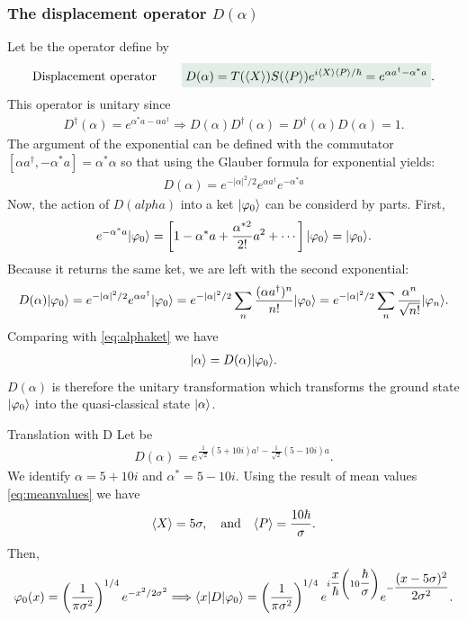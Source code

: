 \subsubsection{The displacement operator $D(\alpha)$}
Let be the operator define by 
\begin{align}
    \text{Displacement operator}\qquad\highlight{D(\alpha)=T(\braket{X})S(\braket{P})e^{i\braket{X}\braket{P}/\hbar}=e^{\alpha a^\dagger-\alpha^*a}}.
\end{align}
This operator is unitary since 
\begin{align*}
    D^\dagger(\alpha)=e^{\alpha^*a-\alpha a^\dagger}\Longrightarrow D(\alpha)D^\dagger(\alpha)=D^\dagger(\alpha)D(\alpha)=1.
\end{align*}
The argument of the exponential can be defined with the commutator $[\alpha a^\dagger,-\alpha^* a]=\alpha^*\alpha$ so that using the Glauber formula for exponential 
yields:
\begin{align*}
    D(\alpha)=e^{-|\alpha|^2/2}e^{\alpha a^\dagger}e^{-\alpha^*a}
\end{align*}
Now, the action of $D(alpha)$ into a ket $|\varphi_0\rangle$ can be considerd by parts. First,
\begin{align*}
    e^{-\alpha^*a}|\varphi_0\rangle=\left[1-\alpha^*a+\frac{\alpha^{*2}}{2!}a^2+\cdots\right]|\varphi_0\rangle=|\varphi_0\rangle.
\end{align*}
Because it returns the same ket, we are left with the second exponential:
\begin{align*}
    D(\alpha)|\varphi_0\rangle=e^{-|\alpha|^2/2}e^{\alpha a^\dagger}|\varphi_0\rangle=e^{-|\alpha|^2/2}\sum_n\frac{(\alpha a^\dagger)^n}{n!}|\varphi_0\rangle=e^{-|\alpha|^2/2}\sum_n\frac{\alpha^n}{\sqrt{n!}}|\varphi_n\rangle.
\end{align*}
Comparing with \eqref{eq:alphaket} we have 
\begin{align}
    |\alpha\rangle=D(\alpha)|\varphi_0\rangle.
\end{align}
$D(\alpha)$ is therefore the unitary transformation which transforms the ground state $|\varphi_0\rangle$ into the quasi-classical state $|\alpha\rangle$.
\begin{example}{Translation with D}
    Let be 
    \begin{align*}
        D(\alpha)=e^{\frac{1}{\sqrt{2}}(5+10i)a^\dagger-\frac{1}{\sqrt{2}}(5-10i)a}.
    \end{align*}
    We identify $\alpha=5+10i$ and $\alpha^*=5-10i$. Using the result of mean values \eqref{eq:meanvalues} we have 
    \begin{align*}
        \langle X\rangle=5\sigma,\quad\text{and}\quad\langle P\rangle=\frac{10\hbar}{\sigma}.
    \end{align*}
    Then,
    \begin{align*}
        \varphi_0(x)=\left(\frac{1}{\pi\sigma^2}\right)^{1/4}e^{-x^2/2\sigma^2}\Longrightarrow\langle x|D|\varphi_0\rangle=\left(\frac{1}{\pi\sigma^2}\right)^{1/4}e^{i\dfrac{x}{\hbar}\left(10\dfrac{\hbar}{\sigma}\right)}e^{-\dfrac{(x-5\sigma)^2}{2\sigma^2}}.
    \end{align*}
\end{example}
%

